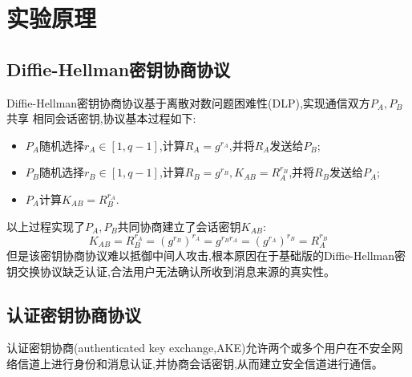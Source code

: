 \section{实验原理}
\subsection{Diffie-Hellman密钥协商协议}
Diffie-Hellman密钥协商协议基于离散对数问题困难性(DLP),实现通信双方$P_A,P_B$共享
相同会话密钥,协议基本过程如下:
\begin{itemize}
    \item [1.]$P_A$随机选择$r_A \in [1,q-1]$,计算$R_A = g^{r_A}$,并将$R_A$发送给$P_B$;
    \item [2.]$P_B$随机选择$r_B \in [1,q-1]$,计算$R_B = g^{r_B},K_{AB} = R_A^{r_B}$,并将$R_B$发送给$P_A$;
    \item [3.]$P_A$计算$K_{AB} = R_B^{r_A}$.
\end{itemize}
以上过程实现了$P_A,P_B$共同协商建立了会话密钥$K_{AB}$:
\[  K_{AB}  = R_B^{r_A} = (g^{r_B})^{r_A} = g^{r_B r_A} = (g^{r_A})^{r_B} = R_A^{r_B}  \]
但是该密钥协商协议难以抵御中间人攻击,根本原因在于基础版的Diffie-Hellman密钥交换协议缺乏认证,合法用户无法确认所收到消息来源的真实性。

\subsection{认证密钥协商协议}
认证密钥协商(authenticated key exchange,AKE)允许两个或多个用户在不安全网络信道上进行身份和消息认证,并协商会话密钥,从而建立安全信道进行通信。

